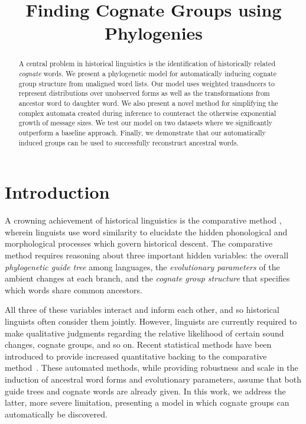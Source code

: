 \documentclass[11pt,a4paper]{article}
\title{Finding Cognate Groups using Phylogenies}
\author{}
\date{}
\begin{document}
\maketitle
\begin{abstract}
  A central problem in historical linguistics is the identification
  of historically related \emph{cognate} words.  We present a
  phylogenetic model for automatically inducing cognate group
  structure from unaligned word lists.  Our model uses weighted
  transducers to represent distributions over unobserved forms as
  well as the transformations from ancestor word to daughter word.
  We also present a novel method for simplifying the complex automata
  created during inference to counteract the otherwise exponential
  growth of message sizes. We test our model on two datasets where
  we significantly outperform a baseline approach.  Finally, we
  demonstrate that our automatically induced groups can be used to
  successfully reconstruct ancestral words.
\end{abstract}
\section{Introduction}

A crowning achievement of historical linguistics is the comparative
method \cite{ohala93phonetics}, wherein linguists use word similarity
to elucidate the hidden phonological and morphological processes
which govern historical descent. The comparative method requires
reasoning about three important hidden variables: the overall
\emph{phylogenetic guide tree} among languages, the \emph{evolutionary
parameters} of the ambient changes at each branch, and the \emph{cognate
group structure} that specifies which words share common ancestors.

All three of these variables interact and inform each other, and
so historical linguists often consider them jointly.  However,
linguists are currently required to make qualitative judgments
regarding the relative likelihood of certain sound changes, cognate
groups, and so on.  Recent statistical methods have been introduced
to provide increased quantitative backing to the comparative
method~\cite{oakes00computer,bouchard07probabilistic,bouchard09improved}.
These automated methods, while providing robustness and scale in
the induction of ancestral word forms and evolutionary parameters,
assume that both guide trees and cognate words are already given.
In this work, we address the latter, more severe limitation,
presenting a model in which cognate groups can automatically be
discovered.
\end{document}
